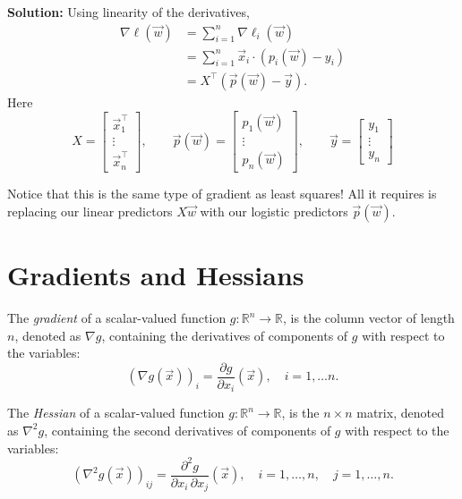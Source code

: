 \documentclass[10pt]{article}
\newcommand{\RR}{\mathbb{R}}
\begin{document}
\begin{enumerate}[label=(\alph*)]
\textbf{Solution:} Using linearity of the derivatives,
\begin{align}
\nabla \ell(\vec{w}) &= \sum_{i=1}^{n} \nabla \ell_i(\vec{w}) \\
&= \sum_{i=1}^{n} \vec{x}_i \cdot (p_i(\vec{w}) - y_i) \\
&= X^\top (\vec{p}(\vec{w}) - \vec{y}).
\end{align}
Here
\begin{equation}
X = \begin{bmatrix} \vec{x}_1^\top \\ \vdots \\ \vec{x}_n^\top \end{bmatrix}, \qquad
\vec{p}(\vec{w}) = \begin{bmatrix} p_1(\vec{w}) \\ \vdots \\ p_n(\vec{w}) \end{bmatrix}, \qquad
\vec{y} = \begin{bmatrix} y_1 \\ \vdots \\ y_n \end{bmatrix}
\end{equation}

Notice that this is the same type of gradient as least squares! All it requires is replacing our linear predictors $X\vec{w}$ with our logistic predictors $\vec{p}(\vec{w})$.
\end{enumerate}

\section{Gradients and Hessians}

The \emph{gradient} of a scalar-valued function $g \colon \RR^n \to \RR$, is the column vector of length $n$, denoted as $\nabla g$, containing the derivatives of components of $g$ with respect to the variables:
\begin{equation}
(\nabla g(\vec{x}))_i = \frac{\partial g}{\partial x_i}(\vec{x}), \quad i = 1, \ldots n.
\end{equation}

The \emph{Hessian} of a scalar-valued function $g \colon \RR^n \to \RR$, is the $n \times n$ matrix, denoted as $\nabla^2 g$, containing the second derivatives of components of $g$ with respect to the variables:
\begin{equation}
(\nabla^2 g(\vec{x}))_{ij} = \frac{\partial^2 g}{\partial x_i \, \partial x_j}(\vec{x}), \quad i = 1, \ldots, n, \quad j = 1, \ldots, n.
\end{equation}
\end{document}
